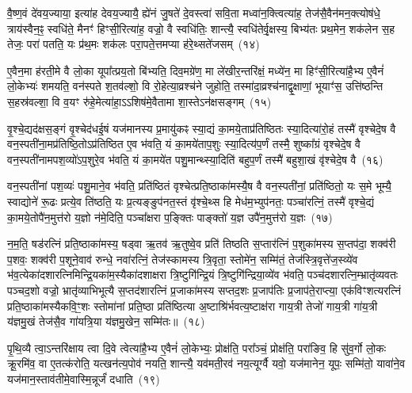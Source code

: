 वै॒ष्ण॒वं दे॑वय॒ज्याया॒ इत्या॑ह देवय॒ज्यायै॒ ह्ये॑नं जु॒षते॑ दे॒वस्त्वा॑ सवि॒ता मध्वा॑न॒क्त्वित्या॑ह॒ तेज॑सै॒वैन॑मन॒क्त्योष॑धे॒ त्राय॑स्वैन॒ꣴ॒ स्वधि॑ते॒ मैनꣳ॑ हिꣳसी॒रित्या॑ह॒ वज्रो॒ वै स्वधि॑तिः॒ शान्त्यै॒ स्वधि॑तेर्वृ॒क्षस्य॒ बिभ्य॑तः प्रथ॒मेन॒ शक॑लेन स॒ह तेजः॒ परा॑ पतति॒ यः प्र॑थ॒मः शक॑लः परा॒पते॒त्तमप्या ह॑रे॒थ्सते॑जसम्~(१४)

ए॒वैन॒मा ह॑रती॒मे वै लो॒का यूपा᳚त्प्रय॒तो बि॑भ्यति॒ दिव॒मग्रे॑ण॒ मा ले॑खीर॒न्तरि॑क्षं॒ मध्ये॑न॒ मा हिꣳ॑सी॒रित्या॑है॒भ्य ए॒वैनं॑ लो॒केभ्यः॑ शमयति॒ वन॑स्पते श॒तव॑ल्\mbox{}शो॒ वि रो॒हेत्या॒व्रश्च॑ने जुहोति॒ तस्मा॑दा॒व्रश्च॑नाद्वृ॒क्षाणां॒ भूयाꣳ॑स॒ उत्ति॑ष्ठन्ति स॒हस्र॑वल्\mbox{}शा॒ वि व॒यꣳ रु॑हे॒मेत्या॑हा॒\-ऽऽ\-शिष॑मे॒वैतामा शा॒स्ते\-ऽन॑क्षसङ्गम्~(१५)

वृ॒श्चे॒द्यद॑क्षस॒ङ्गं वृ॒श्चेद॑धई॒षं यज॑मानस्य प्र॒मायु॑कꣴ स्या॒द्यं का॒मये॒ताप्र॑तिष्ठितः स्या॒दित्या॑रो॒हं तस्मै॑ वृश्चेदे॒ष वै वन॒स्पती॑ना॒मप्र॑तिष्ठि॒तो\-ऽप्र॑तिष्ठित ए॒व भ॑वति॒ यं का॒मये॑ताप॒शुः स्या॒दित्य॑प॒र्णं तस्मै॒ शुष्का᳚ग्रं वृश्चेदे॒ष वै वन॒स्पती॑नामपश॒व्यो॑\-ऽप॒शुरे॒व भ॑वति॒ यं का॒मये॑त पशु॒मान्थ्स्या॒दिति॑ बहुप॒र्णं तस्मै॑ बहुशा॒खं वृ॑श्चेदे॒ष वै~(१६)

वन॒स्पती॑नां पश॒व्यः॑ पशु॒माने॒व भ॑वति॒ प्रति॑ष्ठितं वृश्चेत्प्रति॒ष्ठाका॑मस्यै॒ष वै वन॒स्पती॑नां॒ प्रति॑ष्ठितो॒ यः स॒मे भूम्यै॒ स्वाद्योने॑ रू॒ढः प्रत्ये॒व ति॑ष्ठति॒ यः प्र॒त्यङ्ङुप॑नत॒स्तं वृ॑श्चे॒थ्स हि मेध॑म॒भ्युप॑नतः॒ पञ्चा॑रत्निं॒ तस्मै॑ वृश्चे॒द्यं का॒मये॒तोपै॑न॒मुत्त॑रो य॒ज्ञो न॑मे॒दिति॒ पञ्चा᳚क्षरा प॒ङ्क्तिः पाङ्क्तो॑ य॒ज्ञ उपै॑न॒मुत्त॑रो य॒ज्ञः~(१७)

न॒म॒ति॒ षड॑रत्निं प्रति॒ष्ठाका॑मस्य॒ षड्वा ऋ॒तव॑ ऋ॒तुष्वे॒व प्रति॑ तिष्ठति स॒प्तार॑त्निं प॒शुका॑मस्य स॒प्तप॑दा॒ शक्व॑री प॒शवः॒ शक्व॑री प॒शूने॒वाव॑ रुन्धे॒ नवा॑रत्निं॒ तेज॑स्कामस्य त्रि॒वृता॒ स्तोमे॑न॒ सम्मि॑तं॒ तेज॑स्त्रि॒वृत्ते॑ज॒स्व्ये॑व भ॑व॒त्येका॑\-दशारत्नि\-मिन्द्रि॒यका॑म॒स्यैका॑\-दशाक्षरा त्रि॒ष्टुगि॑न्द्रि॒यं त्रि॒ष्टुगि॑न्द्रिया॒व्ये॑व भ॑वति॒ पञ्च॑दशारत्नि॒म्भ्रातृ॑व्यवतः पञ्चद॒शो वज्रो॒ भ्रातृ॑व्याभिभूत्यै स॒प्तद॑शारत्निं प्र॒जाका॑मस्य सप्तद॒शः प्र॒जा\-प॑तिः प्र॒जा\-प॑ते॒राप्त्या॒ एक॑विꣳशत्यरत्निं प्रति॒ष्ठाका॑मस्यैक\-वि॒ꣳ॒शः स्तोमा॑नां प्रति॒ष्ठा प्रति॑ष्ठित्या अ॒ष्टाश्रि॑र्भवत्य॒ष्टाक्ष॑रा गाय॒त्री तेजो॑ गाय॒त्री गा॑य॒त्री य॑ज्ञमु॒खं तेज॑सै॒व गा॑यत्रि॒या य॑ज्ञमु॒खेन॒ सम्मि॑तः॥~(१८)

{\anuvakamend[{जु॒षे॒ सते॑जस॒मन॑क्षसङ्गं बहुशा॒खं वृ॑श्चेदे॒ष वै य॒ज्ञ उपै॑न॒मुत्त॑रो य॒ज्ञ आप्त्या॒ एका॒न्नविꣳ॑श॒तिश्च॑}]}%

पृ॒थि॒व्यै त्वा॒ऽन्तरि॑क्षाय त्वा दि॒वे त्वेत्या॑है॒भ्य ए॒वैनं॑ लो॒केभ्यः॒ प्रोक्ष॑ति॒ परा᳚ञ्चं॒ प्रोक्ष॑ति॒ परा॑ङिव॒ हि सु॑व॒र्गो लो॒कः क्रू॒रमि॑व॒ वा ए॒तत्क॑रोति॒ यत्खन॑त्य॒पोव॑ नयति॒ शान्त्यै॒ यव॑मती॒रव॑ नय॒त्यूर्ग्वै यवो॒ यज॑मानेन॒ यूपः॒ सम्मि॑तो॒ यावा॑ने॒व यज॑मान॒स्ताव॑तीमे॒वास्मि॒न्नूर्जं॑ दधाति~(१९)

